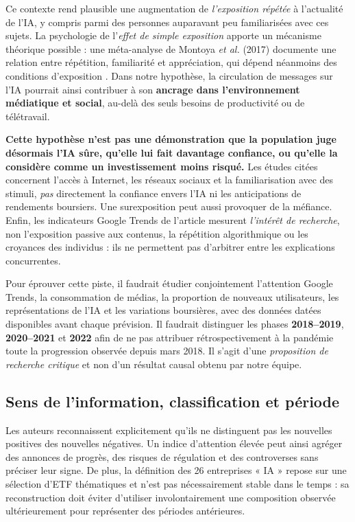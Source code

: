 \documentclass[11pt,a4paper]{article}
\begin{document}
Ce contexte rend plausible une augmentation de \emph{l'exposition répétée} à l'actualité de l'IA, y compris parmi des personnes auparavant peu familiarisées avec ces sujets. La psychologie de l'\emph{effet de simple exposition} apporte un mécanisme théorique possible : une méta-analyse de Montoya \emph{et al.} (2017) documente une relation entre répétition, familiarité et appréciation, qui dépend néanmoins des conditions d'exposition \cite{Montoya2017}. Dans notre hypothèse, la circulation de messages sur l'IA pourrait ainsi contribuer à son \textbf{ancrage dans l'environnement médiatique et social}, au-delà des seuls besoins de productivité ou de télétravail.

\textbf{Cette hypothèse n'est pas une démonstration que la population juge désormais l'IA sûre, qu'elle lui fait davantage confiance, ou qu'elle la considère comme un investissement moins risqué.} Les études citées concernent l'accès à Internet, les réseaux sociaux et la familiarisation avec des stimuli, \emph{pas} directement la confiance envers l'IA ni les anticipations de rendements boursiers. Une surexposition peut aussi provoquer de la méfiance. Enfin, les indicateurs Google Trends de l'article mesurent \emph{l'intérêt de recherche}, non l'exposition passive aux contenus, la répétition algorithmique ou les croyances des individus : ils ne permettent pas d'arbitrer entre les explications concurrentes.

Pour éprouver cette piste, il faudrait étudier conjointement l'attention Google Trends, la consommation de médias, la proportion de nouveaux utilisateurs, les représentations de l'IA et les variations boursières, avec des données datées disponibles avant chaque prévision. Il faudrait distinguer les phases \textbf{2018--2019}, \textbf{2020--2021} et \textbf{2022} afin de ne pas attribuer rétrospectivement à la pandémie toute la progression observée depuis mars 2018. Il s'agit d'une \emph{proposition de recherche critique} et non d'un résultat causal obtenu par notre équipe.

\subsection{Sens de l'information, classification et période}
Les auteurs reconnaissent explicitement qu'ils ne distinguent pas les nouvelles positives des nouvelles négatives. Un indice d'attention élevée peut ainsi agréger des annonces de progrès, des risques de régulation et des controverses sans préciser leur signe. De plus, la définition des 26 entreprises « IA » repose sur une sélection d'ETF thématiques et n'est pas nécessairement stable dans le temps : sa reconstruction doit éviter d'utiliser involontairement une composition observée ultérieurement pour représenter des périodes antérieures.
\end{document}
